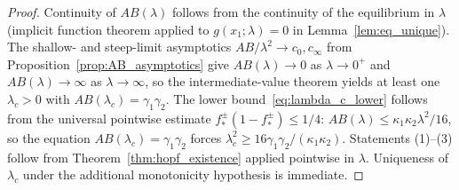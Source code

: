 \documentclass[sn-mathphys,Numbered]{sn-jnl}
\theoremstyle{thmstyleone}
\theoremstyle{thmstyletwo}
\theoremstyle{thmstylethree}
\begin{document}
\begin{proof}
Continuity of $AB(\lambda)$ follows from the continuity of the
equilibrium in $\lambda$ (implicit function theorem applied to $g(x_1;
\lambda)=0$ in Lemma~\ref{lem:eq_unique}). The shallow- and steep-limit
asymptotics $AB/\lambda^2\to c_0,c_\infty$ from
Proposition~\ref{prop:AB_asymptotics} give $AB(\lambda)\to 0$ as
$\lambda\to 0^+$ and $AB(\lambda)\to\infty$ as $\lambda\to\infty$, so
the intermediate-value theorem yields at least one
$\lambda_c>0$ with $AB(\lambda_c)=\gamma_1\gamma_2$. The lower
bound~\eqref{eq:lambda_c_lower} follows from the universal pointwise
estimate $f^\pm_*(1-f^\pm_*)\leq 1/4$:
$AB(\lambda)\leq \kappa_1\kappa_2\lambda^2/16$, so the equation
$AB(\lambda_c)=\gamma_1\gamma_2$ forces
$\lambda_c^2\geq 16\gamma_1\gamma_2/(\kappa_1\kappa_2)$.
Statements (1)--(3) follow from Theorem~\ref{thm:hopf_existence} applied
pointwise in $\lambda$. Uniqueness of $\lambda_c$ under the additional
monotonicity hypothesis is immediate.
\end{proof}
\end{document}
